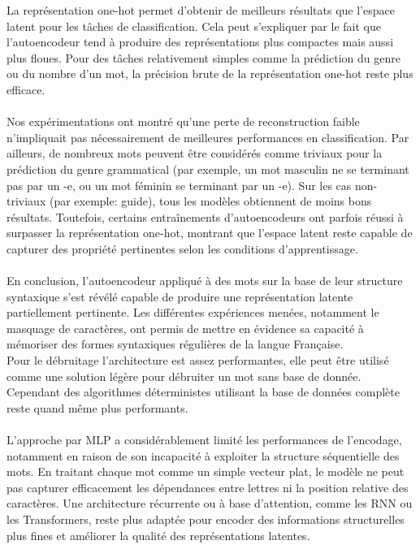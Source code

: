 \documentclass{article}
\begin{document}
La représentation one-hot permet d’obtenir de meilleurs résultats que l’espace latent pour les tâches de classification. Cela peut s’expliquer par le fait que l’autoencodeur tend à produire des représentations plus compactes mais aussi plus floues. Pour des tâches relativement simples comme la prédiction du genre ou du nombre d’un mot, la précision brute de la représentation one-hot reste plus efficace.
\\ \\
Nos expérimentations ont montré qu’une perte de reconstruction faible n’impliquait pas nécessairement de meilleures performances en classification. Par ailleurs, de nombreux mots peuvent être considérés comme triviaux pour la prédiction du genre grammatical (par exemple, un mot masculin ne se terminant pas par un -e, ou un mot féminin se terminant par un -e). Sur les cas non-triviaux (par exemple: guide), tous les modèles obtiennent de moins bons résultats. Toutefois, certains entraînements d’autoencodeurs ont parfois réussi à surpasser la représentation one-hot, montrant que l’espace latent reste capable de capturer des propriété pertinentes selon les conditions d’apprentissage.
\\ \\
En conclusion, l’autoencodeur appliqué à des mots sur la base de leur structure syntaxique s’est révélé capable de produire une représentation latente partiellement pertinente. Les différentes expériences menées, notamment le masquage de caractères, ont permis de mettre en évidence sa capacité à mémoriser des formes syntaxiques régulières de la langue Française.
\\
Pour le débruitage l'architecture est assez performantes, elle peut être utilisé comme une solution légère pour débruiter un mot sans base de donnée. Cependant des algorithmes déterministes utilisant la base de données complète reste quand même plus performants.
\\ \\
L’approche par MLP a considérablement limité les performances de l’encodage, notamment en raison de son incapacité à exploiter la structure séquentielle des mots. En traitant chaque mot comme un simple vecteur plat, le modèle ne peut pas capturer efficacement les dépendances entre lettres ni la position relative des caractères. Une architecture récurrente ou à base d’attention, comme les RNN ou les Transformers, reste plus adaptée pour encoder des informations structurelles plus fines et améliorer la qualité des représentations latentes.
\\ \\
\end{document}
